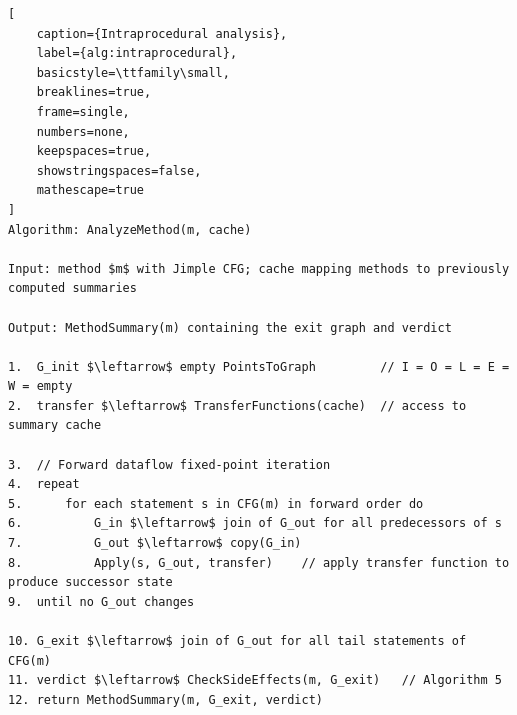 \begin{lstlisting}[
    caption={Intraprocedural analysis}, 
    label={alg:intraprocedural},
    basicstyle=\ttfamily\small,
    breaklines=true,
    frame=single,
    numbers=none,
    keepspaces=true,
    showstringspaces=false,
    mathescape=true
]
Algorithm: AnalyzeMethod(m, cache)

Input: method $m$ with Jimple CFG; cache mapping methods to previously computed summaries

Output: MethodSummary(m) containing the exit graph and verdict

1.  G_init $\leftarrow$ empty PointsToGraph         // I = O = L = E = W = empty
2.  transfer $\leftarrow$ TransferFunctions(cache)  // access to summary cache

3.  // Forward dataflow fixed-point iteration
4.  repeat
5.      for each statement s in CFG(m) in forward order do
6.          G_in $\leftarrow$ join of G_out for all predecessors of s
7.          G_out $\leftarrow$ copy(G_in)
8.          Apply(s, G_out, transfer)    // apply transfer function to produce successor state
9.  until no G_out changes

10. G_exit $\leftarrow$ join of G_out for all tail statements of CFG(m)
11. verdict $\leftarrow$ CheckSideEffects(m, G_exit)   // Algorithm 5
12. return MethodSummary(m, G_exit, verdict)
\end{lstlisting}





